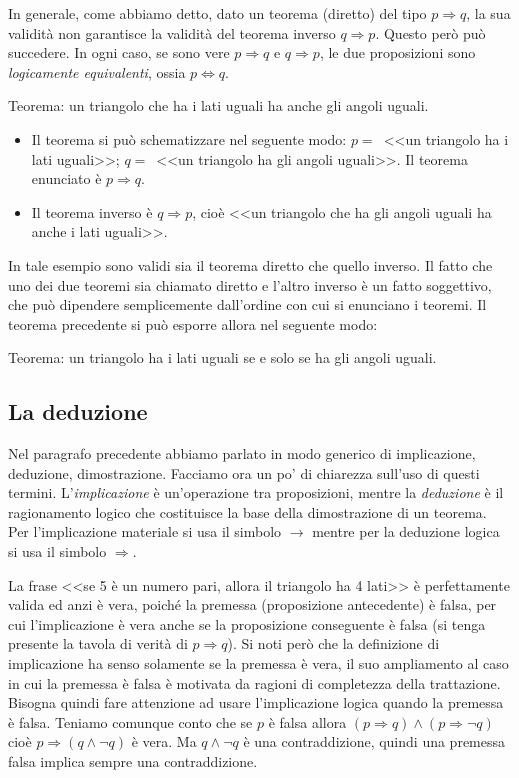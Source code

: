 In generale, come abbiamo detto, dato un teorema (diretto) del tipo $p\Rightarrow q$, la sua validità non garantisce la validità del teorema inverso $q\Rightarrow p$. Questo però può succedere. In ogni caso, se sono vere $p\Rightarrow q$ e $q\Rightarrow p$, le due proposizioni sono \emph{logicamente equivalenti}, ossia $p\Leftrightarrow q$.
\begin{exrig}
\begin{esempio}
Teorema: un triangolo che ha i lati uguali ha anche gli angoli uguali.
\begin{itemize}
\item Il teorema si può schematizzare nel seguente modo: $p=$~<<un triangolo ha i lati uguali>>; $q=$~<<un triangolo ha gli angoli uguali>>. Il teorema enunciato è $p\Rightarrow q$.
\item  Il teorema inverso è  $q\Rightarrow p$, cioè <<un triangolo che ha gli angoli uguali ha anche i lati uguali>>.
\end{itemize}
In tale esempio sono validi sia il teorema diretto che quello inverso. Il fatto che uno dei due teoremi sia chiamato diretto e l'altro inverso è un fatto soggettivo, che può dipendere semplicemente dall'ordine con cui si enunciano i teoremi.
Il teorema precedente si può esporre allora nel seguente modo:
\item Teorema: un triangolo ha i lati uguali se e solo se ha gli angoli uguali.
\end{esempio}
\end{exrig}

\subsection{La deduzione}

Nel paragrafo precedente abbiamo parlato in modo generico di implicazione, deduzione, dimostrazione. Facciamo ora un po' di chiarezza sull'uso di questi termini. L'\emph{implicazione} è un'operazione tra proposizioni, mentre la \emph{deduzione} è il ragionamento logico che costituisce la base della dimostrazione di un teorema. Per l'implicazione materiale si usa il simbolo $\rightarrow$ mentre per la deduzione logica si usa il simbolo $\Rightarrow$.

La frase <<se 5 è un numero pari, allora il triangolo ha 4 lati>> è perfettamente valida ed anzi è vera, poiché la premessa (proposizione antecedente) è falsa, per cui l'implicazione è vera anche se la proposizione conseguente è falsa (si tenga presente la tavola di verità di $p\Rightarrow q$).
Si noti però che la definizione di implicazione ha senso solamente se la premessa è vera, il suo ampliamento al caso in cui la premessa è falsa è motivata da ragioni di completezza della trattazione. Bisogna quindi fare attenzione ad usare l'implicazione logica quando la premessa è falsa. Teniamo comunque conto che se $p$ è falsa allora $(p\Rightarrow q)\wedge(p\Rightarrow \neg q)$ cioè $p\Rightarrow (q\wedge \neg q)$ è vera. Ma  $q\wedge \neg q$ è una contraddizione, quindi una premessa falsa implica sempre una contraddizione.

